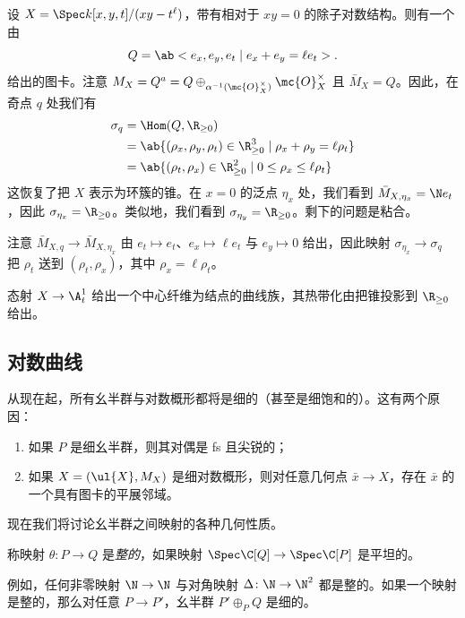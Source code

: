 \begin{exm}
    设 \(X = \Spec k[x,y,t]/(xy-t^{\ell})\)，带有相对于 \(xy = 0\) 的除子对数结构。则有一个由
    \[ Q = \ab<e_x, e_y, e_t \mid e_x + e_y = \ell e_t>. \]
    给出的图卡。注意 \(M_X = Q^a = Q \oplus_{\alpha^{-1}(\mc{O}_X^{\times})} \mc{O}_X^{\times}\) 且 \(\bar{M}_X = Q\)。因此，在奇点 \(q\) 处我们有
    \begin{align*}
        \sigma_q &= \Hom(Q, \R_{\geq 0}) \\
        &= \ab\{ (\rho_x, \rho_y, \rho_t) \in \R_{\geq 0}^3 \mid \rho_x + \rho_y = \ell \rho_t \} \\
        &= \ab\{ (\rho_t, \rho_x) \in \R_{\geq 0}^2 \mid 0 \leq \rho_x \leq \ell \rho_t \}
    \end{align*}
    这恢复了把 \(X\) 表示为环簇的锥。在 \(x = 0\) 的泛点 \(\eta_x\) 处，我们看到 \(\bar{M}_{X, \eta_x} = \N e_t\)，因此 \(\sigma_{\eta_x} = \R_{\geq 0}\)。类似地，我们看到 \(\sigma_{\eta_y} = \R_{\geq 0}\)。剩下的问题是粘合。

    注意 \(\bar{M}_{X, q} \to \bar{M}_{X, \eta_x}\) 由 \(e_t \mapsto e_t\)、\(e_x \mapsto \ell e_t\) 与 \(e_y \mapsto 0\) 给出，因此映射 \(\sigma_{\eta_x} \to \sigma_q\) 把 \(\rho_t\) 送到 \((\rho_t, \rho_x)\)，其中 \(\rho_x = \ell \rho_t\)。

    态射 \(X \to \A^1_t\) 给出一个中心纤维为结点的曲线族，其热带化由把锥投影到 \(\R_{\geq 0}\) 给出。
\end{exm}


\subsection{对数曲线}%
\label{sub:Log curves}

从现在起，所有幺半群与对数概形都将是细的（甚至是细饱和的）。这有两个原因：
\begin{enumerate}
    \item 如果 \(P\) 是细幺半群，则其对偶是 fs 且尖锐的；
    \item 如果 \(X = (\ul{X}, M_X)\) 是细对数概形，则对任意几何点 \(\bar{x} \to X\)，存在 \(\bar{x}\) 的一个具有图卡的平展邻域。
\end{enumerate}

现在我们将讨论幺半群之间映射的各种几何性质。
\begin{defn}
    称映射 \(\theta \colon P \to Q\) 是\textit{整的}，如果映射 \(\Spec\C[Q] \to \Spec \C[P]\) 是平坦的。
\end{defn}

例如，任何非零映射 \(\N \to \N\) 与对角映射 \(\Delta \colon\N \to \N^2\) 都是整的。如果一个映射是整的，那么对任意 \(P \to P'\)，幺半群 \(P' \oplus_P Q\) 是细的。

